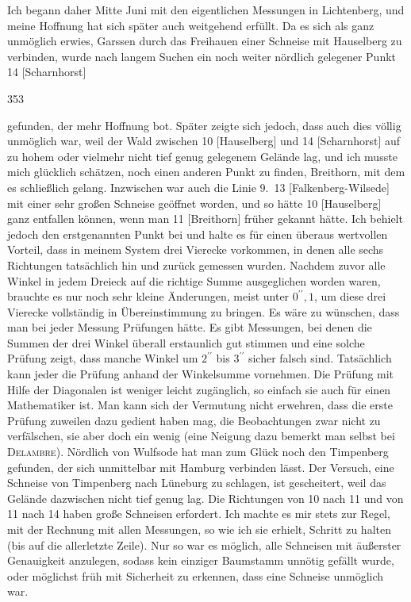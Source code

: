 Ich begann daher Mitte Juni mit den eigentlichen Messungen in Lichtenberg, und meine Hoffnung hat sich später auch weitgehend erfüllt.
Da es sich als ganz unmöglich erwies, Garssen durch das Freihauen einer Schneise mit Hauselberg zu verbinden, wurde nach langem Suchen ein noch weiter nördlich gelegener Punkt 14 [Scharnhorst]
\par\clearpage
{}\hfill353\par\medskip
\noindent gefunden, der mehr Hoffnung bot.
Später zeigte sich jedoch, dass auch dies völlig unmöglich war, weil der Wald zwischen 10 [Hauselberg] und 14 [Scharnhorst] auf zu hohem oder vielmehr nicht tief genug gelegenem Gelände lag, und ich musste mich glücklich schätzen, noch einen anderen Punkt zu finden, Breithorn, mit dem es schließlich gelang.
Inzwischen war auch die Linie 9.~13 [Falkenberg-Wilsede] mit einer sehr großen Schneise geöffnet worden, und so hätte 10 [Hauselberg] ganz entfallen können, wenn man 11 [Breithorn] früher gekannt hätte.
Ich behielt jedoch den erstgenannten Punkt bei und halte es für einen überaus wertvollen Vorteil, dass in meinem System drei Vierecke vorkommen, in denen alle sechs Richtungen tatsächlich hin und zurück gemessen wurden.
Nachdem zuvor alle Winkel in jedem Dreieck auf die richtige Summe ausgeglichen worden waren, brauchte es nur noch sehr kleine Änderungen, meist unter \(0^{\prime\prime}{,}1\), um diese drei Vierecke vollständig in Übereinstimmung zu bringen.
Es wäre zu wünschen, dass man bei jeder Messung  Prüfungen hätte.
Es gibt Messungen, bei denen die Summen der drei Winkel überall erstaunlich gut stimmen und eine solche Prüfung zeigt, dass manche Winkel um \(2^{\prime\prime}\) bis \(3^{\prime\prime}\) sicher falsch sind.
Tatsächlich kann jeder die Prüfung anhand der Winkelsumme vornehmen. Die Prüfung mit Hilfe der Diagonalen ist weniger leicht zugänglich, so einfach sie auch für einen Mathematiker ist. Man kann sich der Vermutung nicht erwehren, dass die erste Prüfung zuweilen dazu gedient haben mag, die Beobachtungen zwar nicht zu verfälschen, sie aber doch ein wenig  (eine Neigung dazu bemerkt man selbst bei \textsc{Delambre}).
Nördlich von Wulfsode hat man zum Glück noch den Timpenberg gefunden, der sich unmittelbar mit Hamburg verbinden lässt. Der Versuch, eine Schneise von Timpenberg nach Lüneburg zu schlagen, ist gescheitert, weil das Gelände dazwischen nicht tief genug lag.
Die Richtungen von 10 nach 11 und von 11 nach 14 haben große Schneisen erfordert.
Ich machte es mir stets zur Regel, mit der Rechnung mit allen Messungen, so wie ich sie erhielt, Schritt zu halten (bis auf die allerletzte Zeile). Nur so war es möglich, alle Schneisen mit äußerster Genauigkeit anzulegen, sodass kein einziger Baumstamm unnötig gefällt wurde, oder möglichst früh mit Sicherheit zu erkennen, dass eine Schneise unmöglich war.
